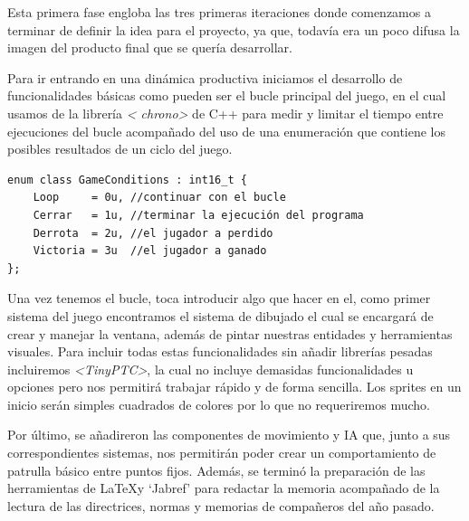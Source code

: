 \newpage

Esta primera fase engloba las tres primeras iteraciones donde comenzamos a terminar de definir 
la idea para el proyecto, ya que, todavía era un poco difusa la imagen del producto final que se
quería desarrollar.

Para ir entrando en una dinámica productiva iniciamos el desarrollo de funcionalidades básicas 
como pueden ser el bucle principal del juego, en el cual usamos de la librería \textit{\textless
chrono\textgreater} de C++ para medir y limitar el tiempo entre ejecuciones del bucle acompañado del uso 
de una enumeración que contiene los posibles resultados de un ciclo del juego.

\begin{lstlisting}[style=CodigoC++, caption={Resultados iteración bucle},label=game_conditions]
enum class GameConditions : int16_t {
	Loop     = 0u, //continuar con el bucle
	Cerrar   = 1u, //terminar la ejecución del programa
	Derrota  = 2u, //el jugador a perdido
	Victoria = 3u  //el jugador a ganado
};
\end{lstlisting}

Una vez tenemos el bucle, toca introducir algo que hacer en el, como primer sistema del juego
encontramos el sistema de dibujado el cual se encargará de crear y manejar la ventana, además
de pintar nuestras entidades y herramientas visuales. Para incluir todas estas funcionalidades
sin añadir librerías pesadas incluiremos \textit{\textless TinyPTC\textgreater}, la cual no 
incluye demasidas funcionalidades u opciones pero nos permitirá trabajar rápido y de forma 
sencilla. Los sprites en un inicio serán simples cuadrados de colores por lo que no requeriremos 
mucho.

Por último, se añadireron las componentes de movimiento y \ac{IA} que, junto a sus correspondientes
sistemas, nos permitirán poder crear un comportamiento de patrulla básico entre puntos fijos.
Además, se terminó la preparación de las herramientas de \LaTeX y `Jabref' para redactar la 
memoria acompañado de la lectura de las directrices, normas y memorias de compañeros del año 
pasado.


